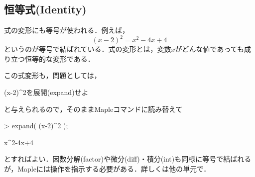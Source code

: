 \subsection{恒等式(Identity)}
式の変形にも等号が使われる．例えば，
\begin{equation*}
(x-2)^2=x^2-4x+4
\end{equation*}
というのが等号で結ばれている．式の変形とは，変数$x$がどんな値であっても成り立つ恒等的な変形である．

この式変形も，問題としては，
\begin{MapleError}
(x-2)^2を展開(expand)せよ
\end{MapleError}
と与えられるので，そのままMapleコマンドに読み替えて
\begin{MapleInput}
> expand( (x-2)^2 );
\end{MapleInput}
\begin{MapleOutput}
x^2-4x+4
\end{MapleOutput}
とすればよい．因数分解(factor)や微分(diff)・積分(int)も同様に等号で結ばれるが，Mapleには操作を指示する必要がある．詳しくは他の単元で．
